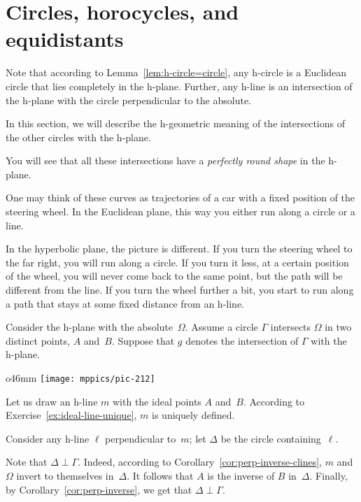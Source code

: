 \section*{Circles, horocycles, and equidistants}

Note that according to Lemma~\ref{lem:h-circle=circle},
any h-circle is a Euclidean circle that lies completely in the h-plane.
Further, any h-line is an intersection of the h-plane with the circle 
perpendicular to the absolute.

In this section, we will describe the 
h-geometric meaning of the intersections 
of the other circles with the h-plane.

You will see that all these intersections have a {}\emph{perfectly round shape} in the h-plane.

One may think of these curves as trajectories of a car with a fixed position of the steering wheel.
In the Euclidean plane, 
this way you either run along a circle or a line.

In the hyperbolic plane, the picture is different.
If you turn the steering wheel to the far right, you will run along a circle.
If you turn it less, at a certain position of the wheel, you will never come back to the same point, but the path will be different from the line.
If you turn the wheel further a bit, you start to run along a path that stays at some fixed distance from an h-line.

Consider the h-plane with the absolute~$\Omega$.
Assume a circle $\Gamma$ intersects $\Omega$ in two distinct points, $A$ and~$B$. 
Suppose that $g$ denotes the intersection of $\Gamma$ with the h-plane.

\begin{wrapfigure}{o}{46mm}
\vskip-0mm
\centering
\texttt{[image: mppics/pic-212]}
\end{wrapfigure}

Let us draw an h-line $m$ with the ideal points $A$ and~$B$.
According to Exercise~\ref{ex:ideal-line-unique}, $m$ is uniquely defined.

Consider any h-line $\ell$ perpendicular to~$m$;
let $\Delta$ be the circle containing~$\ell$.

Note that $\Delta\perp \Gamma$.
Indeed,
according to Corollary~\ref{cor:perp-inverse-clines}, $m$ and $\Omega$ invert to themselves in~$\Delta$.
It follows that $A$ is the inverse of $B$ in~$\Delta$.
Finally, by Corollary~\ref{cor:perp-inverse}, we get that $\Delta\perp \Gamma$.

